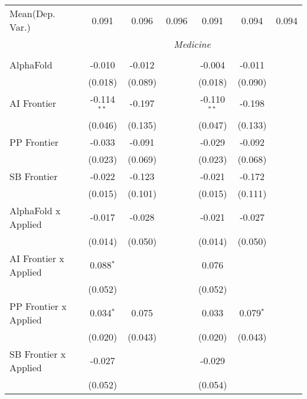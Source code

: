 \begin{tabular}{lcccccc}
Mean(Dep. Var.) & 0.091 & 0.096 & 0.096 & 0.091 & 0.094 & 0.094 \\
 & \multicolumn{6}{c}{\textit{Medicine}} \\ \\
   AlphaFold                    & -0.010        & -0.012  &               & -0.004        & -0.011      &   \\   
                                & (0.018)       & (0.089) &               & (0.018)       & (0.090)     &   \\   
   AI Frontier                  & -0.114$^{**}$ & -0.197  &               & -0.110$^{**}$ & -0.198      &   \\   
                                & (0.046)       & (0.135) &               & (0.047)       & (0.133)     &   \\   
   PP Frontier                  & -0.033        & -0.091  &               & -0.029        & -0.092      &   \\   
                                & (0.023)       & (0.069) &               & (0.023)       & (0.068)     &   \\   
   SB Frontier                  & -0.022        & -0.123  &               & -0.021        & -0.172      &   \\   
                                & (0.015)       & (0.101) &               & (0.015)       & (0.111)     &   \\   
   AlphaFold x Applied          & -0.017        & -0.028  &               & -0.021        & -0.027      &   \\   
                                & (0.014)       & (0.050) &               & (0.014)       & (0.050)     &   \\   
   AI Frontier x Applied        & 0.088$^{*}$   &         &               & 0.076         &             &   \\   
                                & (0.052)       &         &               & (0.052)       &             &   \\   
   PP Frontier x Applied        & 0.034$^{*}$   & 0.075   &               & 0.033         & 0.079$^{*}$ &   \\   
                                & (0.020)       & (0.043) &               & (0.020)       & (0.043)     &   \\   
   SB Frontier x Applied        & -0.027        &         &               & -0.029        &             &   \\   
                                & (0.052)       &         &               & (0.054)       &             &   \\   

\end{tabular}
